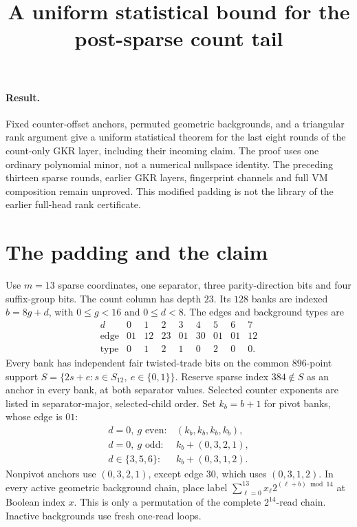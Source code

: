 \documentclass[11pt]{article}
\title{A uniform statistical bound for the post-sparse count tail}
\author{}
\date{}
\begin{document}
\maketitle
\vspace{-2em}

\paragraph{Result.} Fixed counter-offset anchors, permuted geometric backgrounds, and a triangular rank argument give a uniform statistical theorem for the last eight rounds of the count-only GKR layer, including their incoming claim. The proof uses one ordinary polynomial minor, not a numerical nullspace identity. The preceding thirteen sparse rounds, earlier GKR layers, fingerprint channels and full VM composition remain unproved. This modified padding is not the library of the earlier full-head rank certificate.

\section{The padding and the claim}

Use $m=13$ sparse coordinates, one separator, three parity-direction bits and four suffix-group bits. The count column has depth $23$. Its $128$ banks are indexed $b=8g+d$, with $0\le g<16$ and $0\le d<8$. The edges and background types are
\[
\begin{array}{c|rrrrrrrr}
d&0&1&2&3&4&5&6&7\\\hline
\text{edge}&01&12&23&01&30&01&01&12\\
\text{type}&0&1&2&1&0&2&0&0.
\end{array}
\]
Every bank has independent fair twisted-trade bits on the common $896$-point support $S=\{2s+e:s\in S_{12},\ e\in\{0,1\}\}$. Reserve sparse index $384\notin S$ as an anchor in every bank, at both separator values. Selected counter exponents are listed in separator-major, selected-child order. Set $k_b=b+1$ for pivot banks, whose edge is $01$:
\[
\begin{array}{ll}
d=0,\ g\text{ even}:&(k_b,k_b,k_b,k_b),\\
d=0,\ g\text{ odd}:&k_b+(0,3,2,1),\\
d\in\{3,5,6\}:&k_b+(0,3,1,2).
\end{array}
\]
Nonpivot anchors use $(0,3,2,1)$, except edge $30$, which uses $(0,3,1,2)$. In every active geometric background chain, place label $\sum_{\ell=0}^{13}x_\ell2^{(\ell+b)\bmod14}$ at Boolean index $x$. This is only a permutation of the complete $2^{14}$-read chain. Inactive backgrounds use fresh one-read loops.
\end{document}
